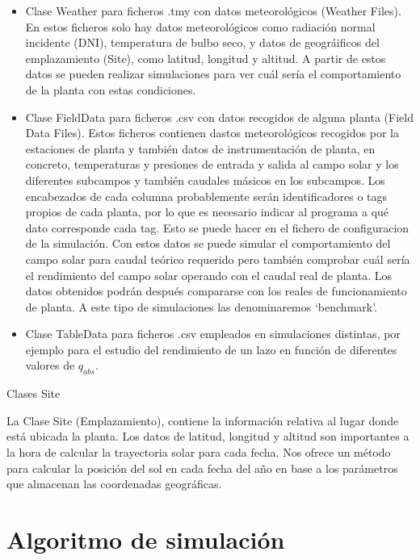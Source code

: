 \begin{itemize}
\item
  Clase Weather para ficheros .tmy con datos meteorológicos (Weather   Files). En estos ficheros solo hay datos meteorológicos como radiación   normal incidente (DNI), temperatura de bulbo seco, y datos de   geográificos del emplazamiento (Site), como latitud, longitud y   altitud. A partir de estos datos se pueden realizar simulaciones para   ver cuál sería el comportamiento de la planta con estas condiciones.
\item
  Clase FieldData para ficheros .csv con datos recogidos de alguna   planta (Field Data Files). Estos ficheros contienen dastos   meteorológicos recogidos por la estaciones de planta y también datos   de instrumentación de planta, en concreto, temperaturas y presiones de   entrada y salida al campo solar y los diferentes subcampos y también   caudales másicos en los subcampos. Los encabezados de cada columna   probablemente serán identificadores o tags propios de cada planta, por
  lo que es necesario indicar al programa a qué dato corresponde cada   tag. Esto se puede hacer en el fichero de configuracion de la   simulación. Con estos datos se puede simular el comportamiento del   campo solar para caudal teórico requerido pero también comprobar cuál   sería el rendimiento del campo solar operando con el caudal real de  planta. Los datos obtenidos podrán después compararse con los reales   de funcionamiento de planta. A este tipo de simulaciones las   denominaremos `benchmark'.
\item
  Clase TableData para ficheros .csv empleados en simulaciones   distintas, por ejemplo para el estudio del rendimiento de un lazo en   función de diferentes valores de \(q_{abs}\).
\end{itemize}

\hypertarget{clases-site}{Clases Site}

La Clase Site (Emplazamiento), contiene la información relativa al lugar donde está ubicada la planta. Los datos de latitud, longitud y altitud son importantes a la hora de calcular la trayectoria solar para cada fecha. Nos ofrece un método para calcular la posición del sol en cada fecha del año en base a los parámetros que almacenan las coordenadas geográficas. 

\section{Algoritmo de simulación}


